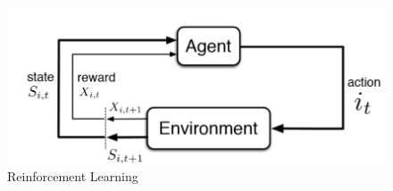 \begin{figure}[!th]
\includegraphics[scale=0.5]{Chapter1/img/RL1.png}
\caption{Reinforcement Learning}
\label{fig:rl}
\end{figure}


